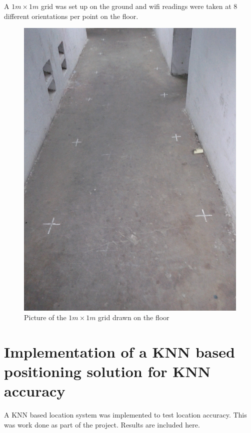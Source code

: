 A $1m \times 1m$ grid was set up on the ground and wifi readings were taken at 8
different orientations per point on the floor.


\begin{figure}
    \centering
    \includegraphics[width=5in,angle=270]{figures/grid_pic}
    \caption{Picture of the $1m \times 1m$ grid drawn on the floor}
\end{figure}

\section{Implementation of a KNN based positioning solution for KNN accuracy\label{sec:knn_pos}}

A KNN based location system was implemented to test location accuracy. 
This was work done as part of the project. Results are included here.

